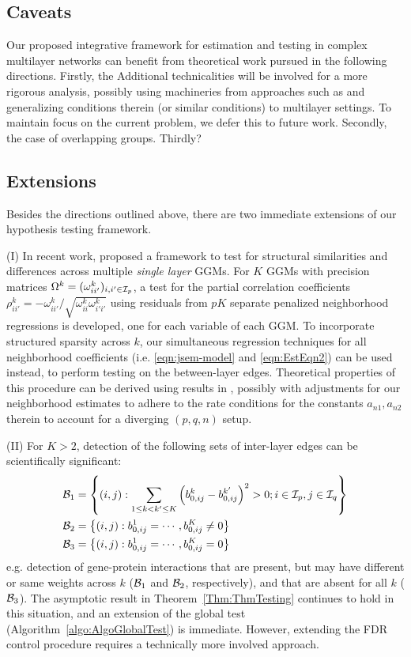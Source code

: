 \subsection{Caveats}
Our proposed integrative framework for estimation and testing in complex multilayer networks can benefit from theoretical work pursued in the following directions. Firstly, the Additional technicalities will be involved for a more rigorous analysis, possibly using machineries from approaches such as \citet{FoygelDrton10,FanTang13, WangKimLi13} and generalizing conditions therein (or similar conditions) to multilayer settings. To maintain focus on the current problem, we defer this to future work. Secondly, the case of overlapping groups. Thirdly?

\subsection{Extensions}
Besides the directions outlined above, there are two immediate extensions of our hypothesis testing framework.

\vspace{1em}
\noindent (I) In recent work, \citet{Liu17} proposed a framework to test for structural similarities and differences across multiple {\it single layer} GGMs. For $K$ GGMs with precision matrices $\Omega^k = (\omega_{ii'}^k)_{i,i' \in {\cal{I}}_p}$, a test for the partial correlation coefficients $\rho_{ii'}^{k} = - \omega_{ii'}^{k} / \sqrt{\omega_{ii}^{k} \omega_{i'i'}^{k}}$ using residuals from $pK$ separate penalized neighborhood regressions is developed, one for each variable of each GGM. To incorporate structured sparsity across $k$, our simultaneous regression techniques for all neighborhood coefficients (i.e. \eqref{eqn:jsem-model} and \eqref{eqn:EstEqn2}) can be used instead, to perform testing on the between-layer edges. Theoretical properties of this procedure can be derived using results in \citet{Liu17}, possibly with adjustments for our neighborhood estimates to adhere to the rate conditions for the constants $a_{n1}, a_{n2}$ therein to account for a diverging $(p,q,n)$ setup.

\noindent (II) For $K > 2$, detection of the following sets of inter-layer edges can be scientifically significant:
%
\begin{align*}
{\cal{B}}_1 &= \left\{ (i,j): \sum_{1 \leq k < k' \leq K} \left(b_{0,ij}^k - b_{0,ij}^{k'} \right)^2 > 0; i \in {\cal{I}}_p, j \in {\cal{I}}_q \right\}\\
{\cal{B}}_2 &= \left\{ (i,j): b_{0,ij}^1 = \cdots, b_{0,ij}^K \neq 0 \right\}\\
{\cal{B}}_3 &= \left\{ (i,j): b_{0,ij}^1 = \cdots, b_{0,ij}^K = 0 \right\}
\end{align*}
%
e.g. detection of gene-protein interactions that are present, but may have different or same weights across $k$ (${\cal{B}}_1$ and ${\cal{B}}_2$, respectively), and that are absent for all $k$ (${\cal{B}}_3$). The asymptotic result in Theorem~\ref{Thm:ThmTesting} continues to hold in this situation, and an extension of the global test (Algorithm~\ref{algo:AlgoGlobalTest}) is immediate. However, extending the FDR control procedure requires a technically more involved approach.

